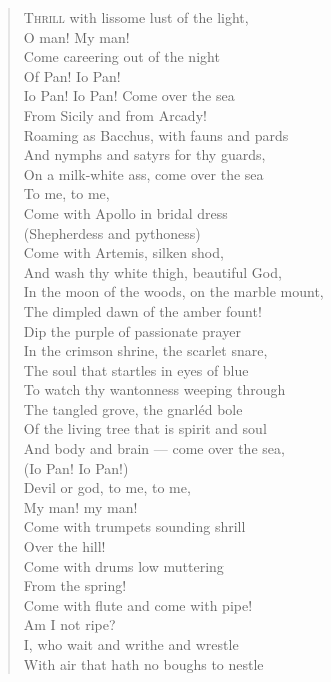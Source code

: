 \begin{verse}
\textsc{Thrill} with lissome lust of the light, \\
O man! My man! \\
Come careering out of the night \\
Of Pan! Io Pan! \\
Io Pan! Io Pan! Come over the sea \\
From Sicily and from Arcady! \\
Roaming as Bacchus, with fauns and pards \\
And nymphs and satyrs for thy guards, \\
On a milk-white ass, come over the sea \\
To me, to me, \\
Come with Apollo in bridal dress \\
(Shepherdess and pythoness) \\
Come with Artemis, silken shod, \\
And wash thy white thigh, beautiful God, \\
In the moon of the woods, on the marble mount, \\
The dimpled dawn of the amber fount! \\
Dip the purple of passionate prayer \\
In the crimson shrine, the scarlet snare, \\
The soul that startles in eyes of blue \\
To watch thy wantonness weeping through \\
The tangled grove, the gnarl\'{e}d bole \\
Of the living tree that is spirit and soul \\
And body and brain --- come over the sea, \\
(Io Pan! Io Pan!) \\
Devil or god, to me, to me, \\
My man! my man! \\
Come with trumpets sounding shrill \\
Over the hill! \\
Come with drums low muttering \\
From the spring! \\
Come with flute and come with pipe! \\
Am I not ripe? \\
I, who wait and writhe and wrestle \\
With air that hath no boughs to nestle \\

\end{verse}
